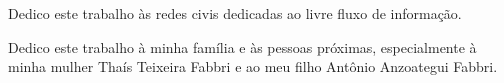 Dedico este trabalho às redes civis dedicadas ao livre fluxo de informação.

Dedico este trabalho à minha família e às pessoas próximas, especialmente
à minha mulher Thaís Teixeira Fabbri e ao meu filho Antônio Anzoategui Fabbri.
